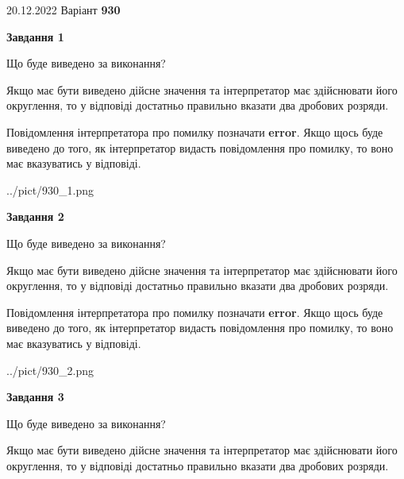 \documentclass[12pt, ukrainian]{article}
\begin{document}
{20.12.2022 Варіант \No \textbf { 930 }\par}
{
\begin {Large}

{\begin {center}\textbf{Завдання 1}\end {center}}\par
Що буде виведено за виконання? \par

Якщо має бути виведено дійсне значення та інтерпретатор має здійснювати його округлення, 
то у відповіді достатньо правильно вказати два дробових розряди.

Повідомлення інтерпретатора про помилку позначати \textbf{error}.
Якщо щось буде виведено до того, як інтерпретатор видасть повідомлення про помилку, 
то воно має вказуватись у відповіді. \par

\begin{center}
	{../pict/930_1.png}
\end{center}
\newpage

{\begin {center}\textbf{Завдання 2}\end {center}}\par
Що буде виведено за виконання? \par

Якщо має бути виведено дійсне значення та інтерпретатор має здійснювати його округлення, 
то у відповіді достатньо правильно вказати два дробових розряди.

Повідомлення інтерпретатора про помилку позначати \textbf{error}.
Якщо щось буде виведено до того, як інтерпретатор видасть повідомлення про помилку, 
то воно має вказуватись у відповіді. \par

\begin{center}
	{../pict/930_2.png}
\end{center}
\newpage

{\begin {center}\textbf{Завдання 3}\end {center}}\par
Що буде виведено за виконання? \par

Якщо має бути виведено дійсне значення та інтерпретатор має здійснювати його округлення, 
то у відповіді достатньо правильно вказати два дробових розряди.


\end{Large}}
\end{document}
